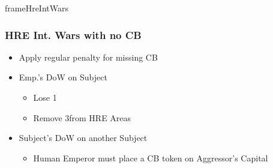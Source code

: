 \documentclass[10pt]{article}
\newlength{\fhHreIntWars} \setlength\fhHreIntWars{8\baselineskip}
\begin{document}
\begin{dynamiccontents*}{frameHreIntWars}\begin{eubox}{\fhHreIntWars}
	\subsubsection*{HRE Int. Wars with no CB }
	\begin{itemize}
		\item Apply regular \stability penalty for missing CB
		\item Emp.'s DoW on Subject
		\begin{itemize}
			\item Lose 1\authority
			\item Remove 3\influence from HRE Areas
		\end{itemize}
		\item Subject's DoW on another Subject
		\begin{itemize}
			\item Human Emperor must place a CB token on Aggressor's Capital
		\end{itemize}
	\end{itemize}
\end{eubox}\end{dynamiccontents*}
\end{document}
